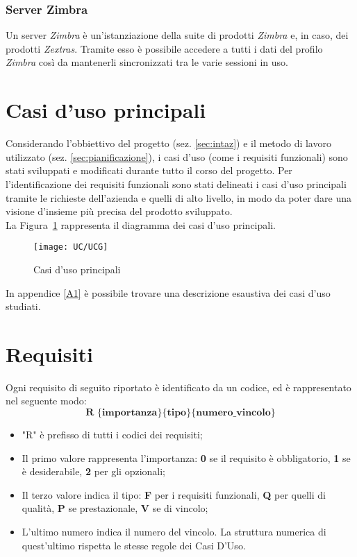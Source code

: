 \subsubsection{Server Zimbra}
Un server \emph{Zimbra} è un'istanziazione della suite di prodotti \emph{Zimbra} e, in caso, 
dei prodotti \emph{Zextras}. Tramite esso è possibile accedere a tutti i dati del profilo \emph{Zimbra} 
così da mantenerli sincronizzati tra le varie sessioni in uso.

\section{Casi d'uso principali}
Considerando l'obbiettivo del progetto (sez. \ref{sec:intaz}) e il metodo di 
lavoro utilizzato (sez. \ref{sec:pianificazione}), i casi d'uso (come i
requisiti funzionali) sono stati sviluppati e modificati durante tutto il corso
del progetto.
Per l'identificazione dei requisiti funzionali sono stati delineati  i casi d'uso principali tramite le richieste dell'azienda e quelli  di alto livello, in modo da poter dare una visione d’insieme più precisa del prodotto sviluppato. \\
La Figura~\ref{fig:ucg} rappresenta il diagramma dei casi d'uso principali.
\begin{figure}[H] 
	\centering
	\texttt{[image: UC/UCG]}
	\caption{Casi d'uso principali}
	\label{fig:ucg}
\end{figure}
In appendice \ref{A1} è possibile trovare una descrizione esaustiva dei casi
d'uso studiati.

\section{Requisiti}
Ogni requisito di seguito riportato è identificato da un codice, ed è
rappresentato nel seguente modo:
$$ \textbf{R \{importanza\}\{tipo\}\{numero\_vincolo\} } $$

\begin{itemize}
	\item "R" è prefisso di tutti i codici dei requisiti;
	\item Il primo valore rappresenta l'importanza: \textbf{0} se il requisito è obbligatorio, \textbf{1} se è desiderabile, \textbf{2} per gli opzionali;
	\item Il terzo valore indica il tipo: \textbf{F} per i requisiti funzionali, \textbf{Q} per quelli di qualità, \textbf{P} se prestazionale, \textbf{V} se di vincolo;
	\item L'ultimo numero indica il numero del vincolo. La struttura numerica di quest'ultimo rispetta le stesse regole dei Casi D'Uso.
\end{itemize}

